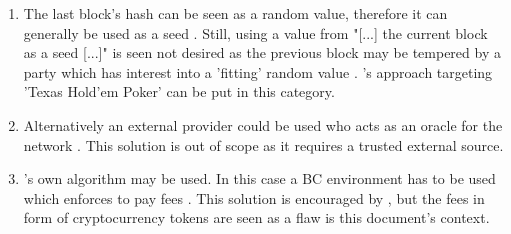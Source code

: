 \begin{enumerate}
	\item The last block's hash can be seen as a random value,
	therefore it can generally be used as a seed \cite[403]{Chatterjee.2019}.
	Still, using a value from "[...] the current block as a seed [...]" \cite[403]{Chatterjee.2019} is seen not desired
	as the previous block may be tempered by a party which has interest into a 'fitting' random value \cite[406]{Chatterjee.2019}.
	\citet{Harkanson.2020}'s approach targeting 'Texas Hold’em Poker' can be put in this category.
	
	\item Alternatively an external provider could be used who acts as an oracle for the network \cite[403]{Chatterjee.2019}.
	This solution is out of scope as it requires a trusted external source.

	\item \citet{Chatterjee.2019}'s own algorithm may be used.
	In this case a \gls{BC} environment has to be used 
	which enforces to pay fees \cite[403]{Chatterjee.2019}.
	This solution is encouraged by \citet[403]{Chatterjee.2019}, but the fees in
	form of cryptocurrency tokens are seen as a flaw is this document's context.


\end{enumerate}
